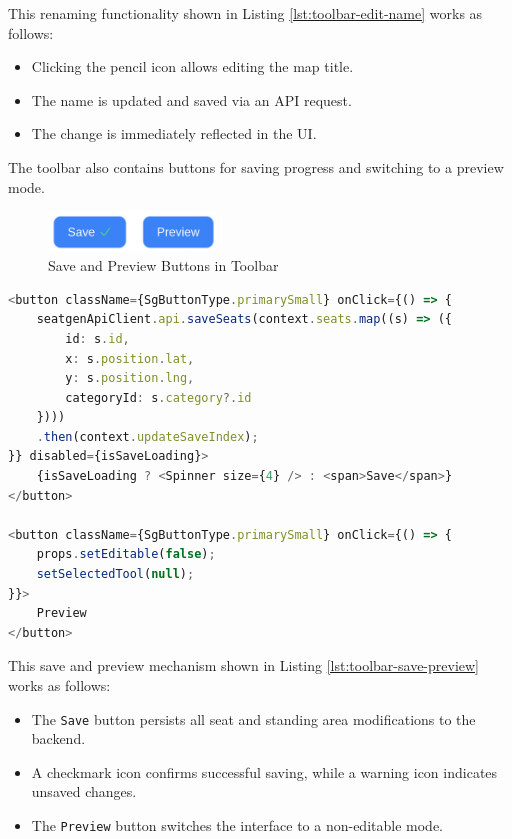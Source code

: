 This renaming functionality shown in Listing \ref{lst:toolbar-edit-name} works as follows:
\begin{itemize}
    \item Clicking the pencil icon allows editing the map title.
    \item The name is updated and saved via an API request.
    \item The change is immediately reflected in the UI.
\end{itemize}

The toolbar also contains buttons for saving progress and switching to a preview mode.

\begin{figure}[H]
    \centering
    \includegraphics[width=0.4\textwidth]{pics/toolbar02.png}
    \caption{Save and Preview Buttons in Toolbar}
    \label{fig:toolbar-save-preview}
\end{figure}

\newpage

\begin{lstlisting}[language=TypeScript, caption=Saving and Previewing, label=lst:toolbar-save-preview]
<button className={SgButtonType.primarySmall} onClick={() => {
    seatgenApiClient.api.saveSeats(context.seats.map((s) => ({
        id: s.id,
        x: s.position.lat,
        y: s.position.lng,
        categoryId: s.category?.id
    })))
    .then(context.updateSaveIndex);
}} disabled={isSaveLoading}>
    {isSaveLoading ? <Spinner size={4} /> : <span>Save</span>}
</button>

<button className={SgButtonType.primarySmall} onClick={() => {
    props.setEditable(false);
    setSelectedTool(null);
}}>
    Preview
</button>
\end{lstlisting}

This save and preview mechanism shown in Listing \ref{lst:toolbar-save-preview} works as follows:
\begin{itemize}
    \item The \texttt{Save} button persists all seat and standing area modifications to the backend.
    \item A checkmark icon confirms successful saving, while a warning icon indicates unsaved changes.
    \item The \texttt{Preview} button switches the interface to a non-editable mode.
\end{itemize}

